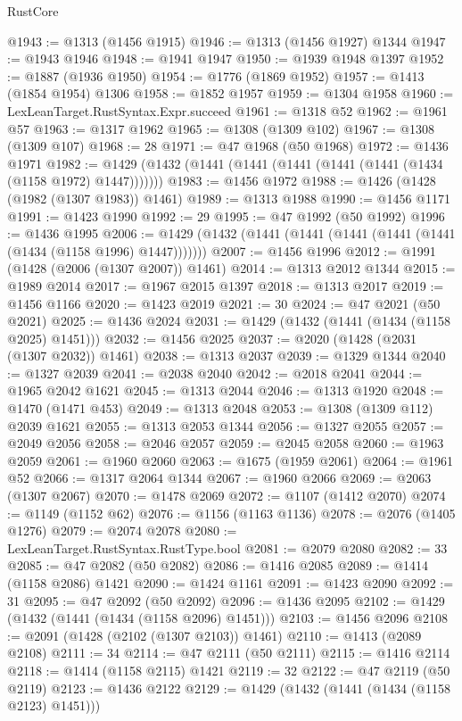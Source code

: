 \begin{lexlean}{RustCore}
\begin{coremodule}
@1943 := @1313 (@1456 @1915)
@1946 := @1313 (@1456 @1927) @1344
@1947 := @1943 @1946
@1948 := @1941 @1947
@1950 := @1939 @1948 @1397
@1952 := @1887 (@1936 @1950)
@1954 := @1776 (@1869 @1952)
@1957 := @1413 (@1854 @1954) @1306
@1958 := @1852 @1957
@1959 := @1304 @1958
@1960 := LexLeanTarget.RustSyntax.Expr.succeed
@1961 := @1318 @52
@1962 := @1961 @57
@1963 := @1317 @1962
@1965 := @1308 (@1309 @102)
@1967 := @1308 (@1309 @107)
@1968 := 28
@1971 := @47 @1968 (@50 @1968)
@1972 := @1436 @1971
@1982 := @1429 (@1432 (@1441 (@1441 (@1441 (@1441 (@1441 (@1434 (@1158 @1972) @1447)))))))
@1983 := @1456 @1972
@1988 := @1426 (@1428 (@1982 (@1307 @1983)) @1461)
@1989 := @1313 @1988
@1990 := @1456 @1171
@1991 := @1423 @1990
@1992 := 29
@1995 := @47 @1992 (@50 @1992)
@1996 := @1436 @1995
@2006 := @1429 (@1432 (@1441 (@1441 (@1441 (@1441 (@1441 (@1434 (@1158 @1996) @1447)))))))
@2007 := @1456 @1996
@2012 := @1991 (@1428 (@2006 (@1307 @2007)) @1461)
@2014 := @1313 @2012 @1344
@2015 := @1989 @2014
@2017 := @1967 @2015 @1397
@2018 := @1313 @2017
@2019 := @1456 @1166
@2020 := @1423 @2019
@2021 := 30
@2024 := @47 @2021 (@50 @2021)
@2025 := @1436 @2024
@2031 := @1429 (@1432 (@1441 (@1434 (@1158 @2025) @1451)))
@2032 := @1456 @2025
@2037 := @2020 (@1428 (@2031 (@1307 @2032)) @1461)
@2038 := @1313 @2037
@2039 := @1329 @1344
@2040 := @1327 @2039
@2041 := @2038 @2040
@2042 := @2018 @2041
@2044 := @1965 @2042 @1621
@2045 := @1313 @2044
@2046 := @1313 @1920
@2048 := @1470 (@1471 @453)
@2049 := @1313 @2048
@2053 := @1308 (@1309 @112) @2039 @1621
@2055 := @1313 @2053 @1344
@2056 := @1327 @2055
@2057 := @2049 @2056
@2058 := @2046 @2057
@2059 := @2045 @2058
@2060 := @1963 @2059
@2061 := @1960 @2060
@2063 := @1675 (@1959 @2061)
@2064 := @1961 @52
@2066 := @1317 @2064 @1344
@2067 := @1960 @2066
@2069 := @2063 (@1307 @2067)
@2070 := @1478 @2069
@2072 := @1107 (@1412 @2070)
@2074 := @1149 (@1152 @62)
@2076 := @1156 (@1163 @1136)
@2078 := @2076 (@1405 @1276)
@2079 := @2074 @2078
@2080 := LexLeanTarget.RustSyntax.RustType.bool
@2081 := @2079 @2080
@2082 := 33
@2085 := @47 @2082 (@50 @2082)
@2086 := @1416 @2085
@2089 := @1414 (@1158 @2086) @1421
@2090 := @1424 @1161
@2091 := @1423 @2090
@2092 := 31
@2095 := @47 @2092 (@50 @2092)
@2096 := @1436 @2095
@2102 := @1429 (@1432 (@1441 (@1434 (@1158 @2096) @1451)))
@2103 := @1456 @2096
@2108 := @2091 (@1428 (@2102 (@1307 @2103)) @1461)
@2110 := @1413 (@2089 @2108)
@2111 := 34
@2114 := @47 @2111 (@50 @2111)
@2115 := @1416 @2114
@2118 := @1414 (@1158 @2115) @1421
@2119 := 32
@2122 := @47 @2119 (@50 @2119)
@2123 := @1436 @2122
@2129 := @1429 (@1432 (@1441 (@1434 (@1158 @2123) @1451)))

\end{coremodule}
\end{lexlean}

